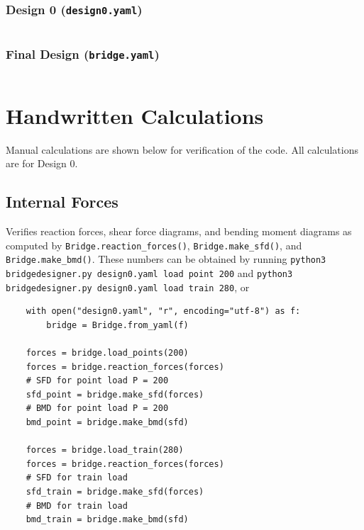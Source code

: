 \documentclass{article}
\begin{document}
\subsubsection{Design 0 (\texttt{design0.yaml})}
\label{sec:design0}

\inputminted[linenos, breaklines, fontsize=\small]{yaml}{../../design0.yaml}
\pagebreak

\subsubsection{Final Design (\texttt{bridge.yaml})}
\label{sec:design}

\inputminted[linenos, breaklines, fontsize=\small]{yaml}{../../new.yaml}
\pagebreak

\section{Handwritten Calculations}

Manual calculations are shown below for verification of the code. All calculations are for Design 0.

\subsection{Internal Forces}

Verifies reaction forces, shear force diagrams, and bending moment diagrams as computed by
\texttt{Bridge.reaction_forces()}, \texttt{Bridge.make_sfd()}, and
\texttt{Bridge.make_bmd()}. These numbers can be obtained by running
\texttt{python3 bridgedesigner.py design0.yaml load point 200} and
\texttt{python3 bridgedesigner.py design0.yaml load train 280}, or
\begin{verbatim}
    with open("design0.yaml", "r", encoding="utf-8") as f:
        bridge = Bridge.from_yaml(f)
    
    forces = bridge.load_points(200)
    forces = bridge.reaction_forces(forces)
    # SFD for point load P = 200
    sfd_point = bridge.make_sfd(forces)
    # BMD for point load P = 200
    bmd_point = bridge.make_bmd(sfd)

    forces = bridge.load_train(280)
    forces = bridge.reaction_forces(forces)
    # SFD for train load
    sfd_train = bridge.make_sfd(forces)
    # BMD for train load
    bmd_train = bridge.make_bmd(sfd)
\end{verbatim}
\end{document}
